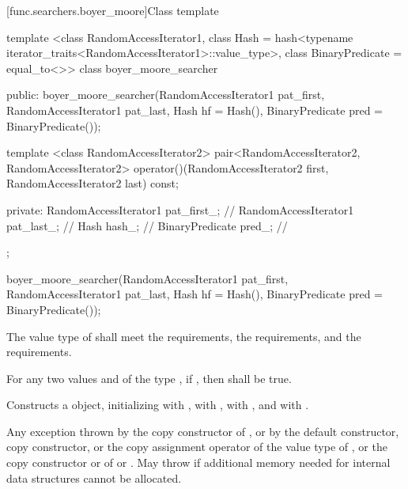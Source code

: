 [func.searchers.boyer_moore]{Class template }

%
\begin{codeblock}
template <class RandomAccessIterator1,
          class Hash = hash<typename iterator_traits<RandomAccessIterator1>::value_type>,
          class BinaryPredicate = equal_to<>>
class boyer_moore_searcher {
public:
  boyer_moore_searcher(RandomAccessIterator1 pat_first,
                       RandomAccessIterator1 pat_last, Hash hf = Hash(),
                       BinaryPredicate pred = BinaryPredicate());

  template <class RandomAccessIterator2>
    pair<RandomAccessIterator2, RandomAccessIterator2>
      operator()(RandomAccessIterator2 first,
                 RandomAccessIterator2 last) const;

private:
  RandomAccessIterator1 pat_first_; // \expos
  RandomAccessIterator1 pat_last_;  // \expos
  Hash hash_;                       // \expos
  BinaryPredicate pred_;            // \expos
};
\end{codeblock}

%
\begin{itemdecl}
boyer_moore_searcher(RandomAccessIterator1 pat_first,
                     RandomAccessIterator1 pat_last, Hash hf = Hash(),
                     BinaryPredicate pred = BinaryPredicate());
\end{itemdecl}

\begin{itemdescr}
\pnum
\requires
The value type of  shall meet the  requirements, the  requirements, and the  requirements.

\pnum
\requires
For any two values  and  of the type , if , then  shall be true.

\pnum
\effects
Constructs a  object, initializing  with ,  with ,  with , and  with .

\pnum
\throws
Any exception thrown by the copy constructor of ,
or by the default constructor, copy constructor, or the copy assignment operator of the value type of ,
or the copy constructor or  of  or .
May throw  if additional memory needed for internal data structures cannot be allocated.
\end{itemdescr}

